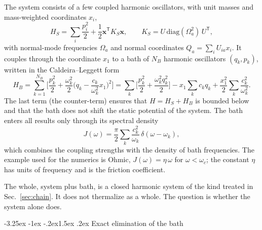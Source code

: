\documentclass[10pt,a4paper]{article}
\makeatletter
\renewcommand{\subsection}{\@startsection{subsection}{2}{\z@}%
  {-3.25ex \@plus -1ex \@minus -.2ex}{1.5ex \@plus .2ex}%
  {\normalfont\fontsize{15.5pt}{19pt}\selectfont\bfseries}}
\makeatother
\begin{document}
The system consists of a few coupled harmonic oscillators, with unit masses and mass-weighted coordinates $ x_i $,
\begin{equation}
  H_S = \sum_i \frac{p_i^2}{2} + \frac12 \mathbf x^{\mathsf T} K_S \mathbf x ,
  \qquad
  K_S = U \, \mathrm{diag}(\Omega_a^2) \, U^{\mathsf T} ,
  \label{eq:HS}
\end{equation}
with normal-mode frequencies $ \Omega_a $ and normal coordinates $ Q_a = \sum_i U_{ia} x_i $.
It couples through the coordinate $ x_1 $ to a bath of $ N_B $ harmonic oscillators $ (q_k, p_k) $, written in the Caldeira--Leggett form~\cite{Caldeira1983,Zwanzig1973}
\begin{equation}
  H_B = \sum_{k=1}^{N_B} \bigg[ \frac{p_k^2}{2} + \frac{\omega_k^2}{2} \Big( q_k - \frac{c_k}{\omega_k^2} x_1 \Big)^2 \bigg]
  = \sum_k \Big[ \frac{p_k^2}{2} + \frac{\omega_k^2 q_k^2}{2} \Big] - x_1 \sum_k c_k q_k + \frac{x_1^2}{2} \sum_k \frac{c_k^2}{\omega_k^2} .
  \label{eq:HB}
\end{equation}
The last term (the counter-term) ensures that $ H = H_S + H_B $ is bounded below and that the bath does not shift the static potential of the system.
The bath enters all results only through its spectral density
\begin{equation}
  J(\omega) = \frac{\pi}{2} \sum_k \frac{c_k^2}{\omega_k} \, \delta(\omega - \omega_k) ,
  \label{eq:Jclass}
\end{equation}
which combines the coupling strengths with the density of bath frequencies.
The example used for the numerics is Ohmic, $ J(\omega) = \eta \, \omega $ for $ \omega < \omega_c $; the constant $ \eta $ has units of frequency and is the friction coefficient.

The whole, system plus bath, is a closed harmonic system of the kind treated in Sec.~\ref{sec:chain}.
It does not thermalize as a whole.
The question is whether the system alone does.

\subsection{Exact elimination of the bath}
\label{sec:gle}
\end{document}
